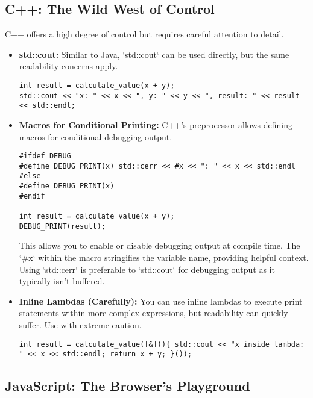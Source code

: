 \documentclass{article}
\begin{document}
{{{{\subsection*{C++: The Wild West of Control}

C++ offers a high degree of control but requires careful attention to detail.

\begin{itemize}
    \item \textbf{std::cout:} Similar to Java, `std::cout` can be used directly, but the same readability concerns apply.

\begin{verbatim}
int result = calculate_value(x + y);
std::cout << "x: " << x << ", y: " << y << ", result: " << result << std::endl;
\end{verbatim}

    \item \textbf{Macros for Conditional Printing:} C++'s preprocessor allows defining macros for conditional debugging output.

\begin{verbatim}
#ifdef DEBUG
#define DEBUG_PRINT(x) std::cerr << #x << ": " << x << std::endl
#else
#define DEBUG_PRINT(x)
#endif

int result = calculate_value(x + y);
DEBUG_PRINT(result);
\end{verbatim}

        This allows you to enable or disable debugging output at compile time.  The `#x` within the macro stringifies the variable name, providing helpful context.  Using `std::cerr` is preferable to `std::cout` for debugging output as it typically isn't buffered.

    \item \textbf{Inline Lambdas (Carefully):}  You can use inline lambdas to execute print statements within more complex expressions, but readability can quickly suffer. Use with extreme caution.

\begin{verbatim}
int result = calculate_value([&](){ std::cout << "x inside lambda: " << x << std::endl; return x + y; }());
\end{verbatim}

\end{itemize}

\subsection*{JavaScript: The Browser's Playground}

}}}}
\end{document}
